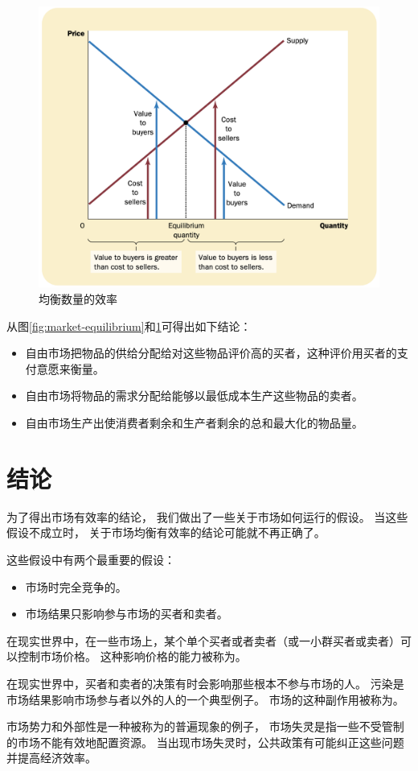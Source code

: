\begin{figure}[!ht]
  \centering
  \includegraphics{pics/market-equilibrium2}
  \caption{均衡数量的效率}
  \label{fig:market-equilibrium2}
\end{figure}


从图\ref{fig:market-equilibrium}和\ref{fig:market-equilibrium2}可得出如下结论：
\begin{itemize}
\item 自由市场把物品的供给分配给对这些物品评价高的买者，这种评价用买者的支付意愿来衡量。
\item 自由市场将物品的需求分配给能够以最低成本生产这些物品的卖者。
\item 自由市场生产出使消费者剩余和生产者剩余的总和最大化的物品量。
\end{itemize}


\section{结论}

为了得出市场有效率的结论，
我们做出了一些关于市场如何运行的假设。
当这些假设不成立时，
关于市场均衡有效率的结论可能就不再正确了。


这些假设中有两个最重要的假设：
\begin{itemize}
\item 市场时完全竞争的。
\item 市场结果只影响参与市场的买者和卖者。
\end{itemize}


在现实世界中，在一些市场上，某个单个买者或者卖者（或一小群买者或卖者）可以控制市场价格。
这种影响价格的能力被称为。

在现实世界中，买者和卖者的决策有时会影响那些根本不参与市场的人。
污染是市场结果影响市场参与者以外的人的一个典型例子。
市场的这种副作用被称为。

市场势力和外部性是一种被称为的普遍现象的例子，
市场失灵是指一些不受管制的市场不能有效地配置资源。
当出现市场失灵时，公共政策有可能纠正这些问题并提高经济效率。
